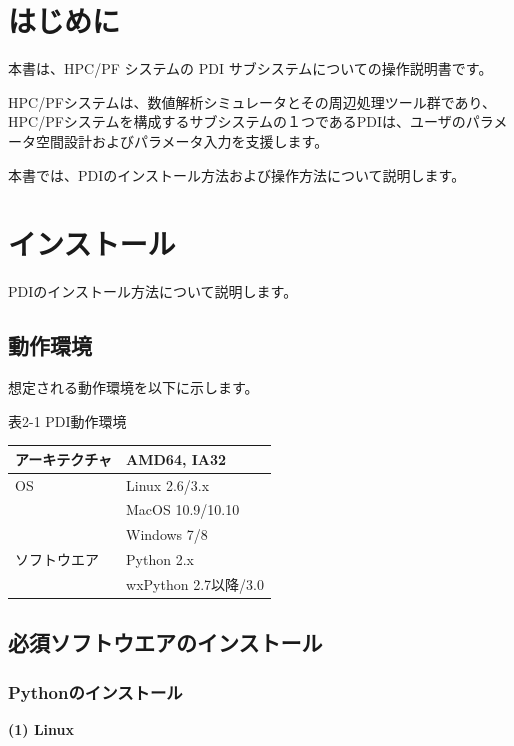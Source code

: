 \documentclass[a4paper,11pt]{jarticle}
\begin{document}
\newpage
\tableofcontents


\newpage
\section*{はじめに}

本書は、HPC/PF システムの PDI サブシステムについての操作説明書です。


HPC/PFシステムは、数値解析シミュレータとその周辺処理ツール群であり、HPC/PFシステムを構成するサブシステムの１つであるPDIは、ユーザのパラメータ空間設計およびパラメータ入力を支援します。


本書では、PDIのインストール方法および操作方法について説明します。

\newpage
\section{インストール}

\vspace{12pt}
PDIのインストール方法について説明します。

\subsection{動作環境}

想定される動作環境を以下に示します。

表2-1 PDI動作環境

\begin{tabular}{|l|l|}
\hline
アーキテクチャ & AMD64, IA32\\ \hline
OS & Linux 2.6/3.x\\
   & MacOS 10.9/10.10\\
   & Windows 7/8\\ \hline
ソフトウエア & Python 2.x\\
             & wxPython 2.7以降/3.0\\ \hline
\end{tabular}

\subsection{必須ソフトウエアのインストール}

\subsubsection{Pythonのインストール}

\textbf{(1) Linux}
\end{document}
